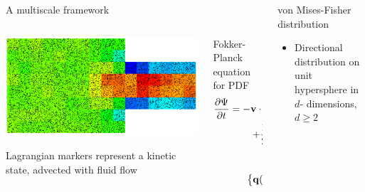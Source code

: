 \documentclass[final,t]{beamer}
\def\xv{{\bf x}}
\def\qv{{\bf q}}
\def\vv{{\bf v}}
\def\Fv{{\bf F}}
\def\Gammab{{\mbox{\boldmath{$\Gamma$}}}}
\begin{document}
\begin{frame}{}
\begin{columns}[t]
\begin{column}{.3\linewidth}
      \begin{block}{A multiscale framework}
        \begin{columns}[T]
          \begin{column}{.49\linewidth}
    	\centerline{\includegraphics[width=.9 \linewidth]{figures/visit0001}}
    	Lagrangian markers represent a kinetic state, advected with fluid flow
	    \end{column}
	    
       \begin{column}{.49\linewidth}
       Fokker-Planck equation for PDF \cite{Kallemov12}
       \begin{eqnarray*}
		\frac{\partial \Psi}{\partial t} 
			= - \vv \cdot \nabla_\xv \Psi
		     - \nabla_\vv \cdot ( \Fv(\xv,\vv) \Psi) \\
		     + \frac{1}{2} \Gammab_{\alpha \delta}(\xv) \Gammab_{\beta \delta}	
		     		(\xv) \frac{\partial^2 \Psi}{\partial \vv_\alpha \partial \vv_\beta}
		\end{eqnarray*}
		
       \begin{eqnarray*}
		&&\Psi(\qv\vert \xv,t) \rightarrow \\
		&&~~~~~~~\big \{ \qv(t), \vv(t) \rightarrow \qv(t+\Delta t), \vv(t+\Delta t) \big \} \\
		&&~~~~~~~\rightarrow \Psi(\qv\vert \xv+u\Delta t, t+\Delta t )
		\end{eqnarray*}
		
        \end{column}
    
        \end{columns}
	   \end{block}
       
      
    \end{column}
    \begin{column}{.3\linewidth}
      \begin{block}{von Mises-Fisher distribution}
        \vfill
        \begin{itemize}
        \item Directional distribution on unit hypersphere in $d$- dimensions, $d \geq 2$
  

\end{itemize}
\end{block}
\end{column}
\end{columns}
\end{frame}
\end{document}
